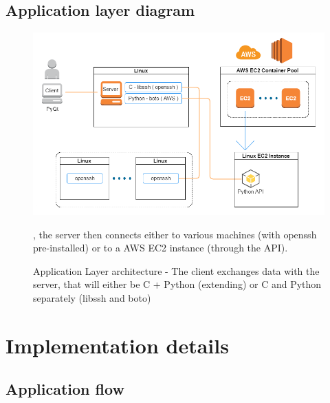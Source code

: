 \documentclass{llncs}
\begin{document}
\subsection{Application layer diagram}


\begin{figure}[!ht]
\includegraphics[scale=0.6]{app-layer.png}
\centering
\caption{Application Layer architecture - The client exchanges data with the server, that will either be C + Python (extending) or C and Python separately (libssh and boto)}, the server then connects either to various machines (with openssh pre-installed) or to a AWS EC2 instance (through the API).
\end{figure}


\FloatBarrier
%
\section{Implementation details}
%

\subsection{Application flow}
\end{document}
